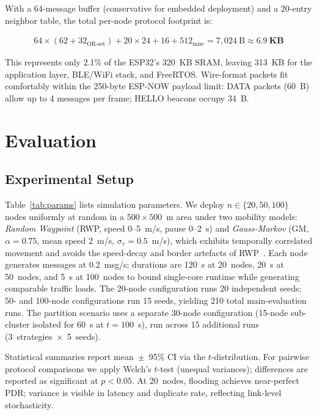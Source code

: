 \documentclass[conference]{IEEEtran}
\begin{document}
With a 64-message buffer (conservative for embedded deployment) and a
20-entry neighbor table, the total per-node protocol footprint is:

\begin{align*}
  64 \times (62 + 32_{\text{OR-set}}) + 20 \times 24 + 16 + 512_{\text{misc}}
  = 7{,}024~\text{B} \approx \mathbf{6.9~\text{KB}}
\end{align*}

This represents only 2.1\% of the ESP32's 320~KB SRAM, leaving 313~KB for
the application layer, BLE/WiFi stack, and FreeRTOS.  Wire-format packets
fit comfortably within the 250-byte ESP-NOW payload limit: DATA packets
(60~B) allow up to 4 messages per frame; HELLO beacons occupy 34~B.

\section{Evaluation}
\label{sec:eval}

\subsection{Experimental Setup}
Table~\ref{tab:params} lists simulation parameters.  We deploy
$n\in\{20,50,100\}$ nodes uniformly at random in a $500\times500$~m area under
two mobility models: \emph{Random Waypoint} (RWP, speed 0--5~m/s, pause 0--2~s)
and \emph{Gauss-Markov} (GM, $\alpha=0.75$, mean speed 2~m/s, $\sigma_v=0.5$~m/s),
which exhibits temporally correlated movement and avoids the speed-decay and border
artefacts of RWP~\cite{liang_gm_1999}.  Each node generates messages at 0.2~msg/s;
durations are 120~s at 20~nodes, 20~s at 50~nodes, and 5~s at 100~nodes to bound
single-core runtime while generating comparable traffic loads.  The 20-node
configuration runs 20 independent seeds; 50- and 100-node configurations run 15
seeds, yielding 210 total main-evaluation runs.  The partition scenario uses a
separate 30-node configuration (15-node sub-cluster isolated for 60~s at $t=100$~s),
run across 15 additional runs (3~strategies~$\times$~5~seeds).

Statistical summaries report mean~$\pm$~95\% CI via the $t$-distribution.
For pairwise protocol comparisons we apply Welch's $t$-test (unequal variances);
differences are reported as significant at $p<0.05$.  At 20~nodes, flooding
achieves near-perfect PDR; variance is visible in latency and duplicate rate,
reflecting link-level stochasticity.
\end{document}
